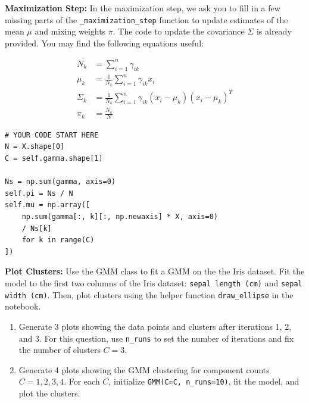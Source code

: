 \documentclass{article}
\begin{document}
\begin{probset}
\begin{prob}
\begin{subprobset}
        \newpage
        \begin{subprob}
            \textbf{Maximization Step:} In the maximization step, we ask you to fill in a few missing parts of the \texttt{\_maximization\_step} function to update estimates of the mean $\mu$ and mixing weights $\pi$. The code to update the covariance $\Sigma$ is already provided. You may find the following
            equations useful:

            \begin{align*}
            N_k &= \sum_{i=1}^n \gamma_{ik} \\
            \mu_k &= \frac{1}{N_k} \sum_{i=1}^n \gamma_{ik} x_i \\
            \Sigma_k &= \frac{1}{N_k} \sum_{i=1}^n \gamma_{ik} (x_i - \mu_k)(x_i - \mu_k)^T \\
            \pi_k &= \frac{N_k}{N}
            \end{align*}

            \begin{verbatim}
# YOUR CODE START HERE
N = X.shape[0]
C = self.gamma.shape[1]

Ns = np.sum(gamma, axis=0)
self.pi = Ns / N
self.mu = np.array([
    np.sum(gamma[:, k][:, np.newaxis] * X, axis=0) 
    / Ns[k] 
    for k in range(C)
])
            \end{verbatim}
        \end{subprob}

        \newpage
        \begin{subprob}
            \textbf{Plot Clusters:} Use the GMM class to fit a GMM on the the Iris dataset. Fit the model to the first two columns of the Iris dataset: \texttt{sepal length (cm)} and \texttt{sepal width (cm)}. Then, plot clusters using the helper function \texttt{draw\_ellipse} in the notebook. 
            \begin{enumerate}[label=\alph*.]
                \item Generate 3 plots showing the data points and clusters after iterations 1, 2, and 3. For this question, use \texttt{n\_runs} to set the number of iterations and fix the number of clusters $C = 3$.
                \item Generate 4 plots showing the GMM clustering for component counts $C = 1, 2, 3, 4$. For each $C$, initialize \texttt{GMM(C=C, n\_runs=10)}, fit the model, and plot the clusters.
            \end{enumerate}


\end{subprob}
\end{subprobset}
\end{prob}
\end{probset}
\end{document}
